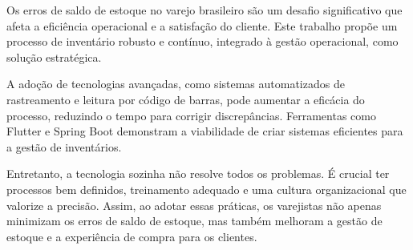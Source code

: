 %
%

Os erros de saldo de estoque no varejo brasileiro são um desafio significativo que afeta a eficiência operacional e a satisfação do cliente. Este trabalho propõe um processo de inventário robusto e contínuo, integrado à gestão operacional, como solução estratégica.

A adoção de tecnologias avançadas, como sistemas automatizados de rastreamento e leitura por código de barras, pode aumentar a eficácia do processo, reduzindo o tempo para corrigir discrepâncias. Ferramentas como Flutter e Spring Boot demonstram a viabilidade de criar sistemas eficientes para a gestão de inventários.

Entretanto, a tecnologia sozinha não resolve todos os problemas. É crucial ter processos bem definidos, treinamento adequado e uma cultura organizacional que valorize a precisão. Assim, ao adotar essas práticas, os varejistas não apenas minimizam os erros de saldo de estoque, mas também melhoram a gestão de estoque e a experiência de compra para os clientes.